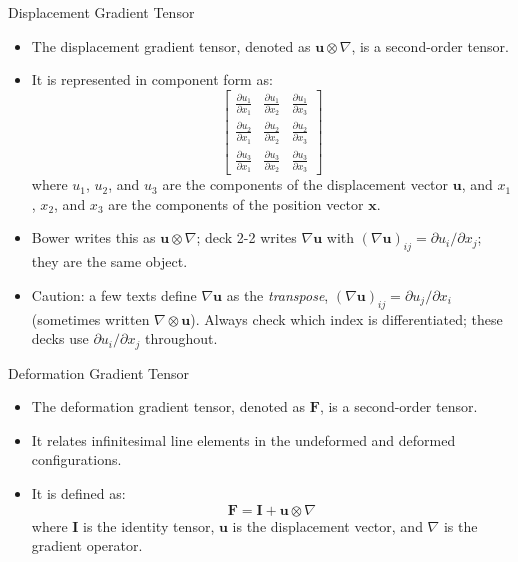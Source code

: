 \documentclass[aspectratio=169,11pt]{beamer}
\begin{document}
\begin{frame}{Displacement Gradient Tensor}
    \begin{itemize}
        \item The displacement gradient tensor, denoted as \(\mathbf{u} \otimes \nabla\), is a second-order tensor.
        \item It is represented in component form as:
            \[
            \begin{bmatrix}
                \frac{\partial u_1}{\partial x_1} & \frac{\partial u_1}{\partial x_2} & \frac{\partial u_1}{\partial x_3} \\
                \frac{\partial u_2}{\partial x_1} & \frac{\partial u_2}{\partial x_2} & \frac{\partial u_2}{\partial x_3} \\
                \frac{\partial u_3}{\partial x_1} & \frac{\partial u_3}{\partial x_2} & \frac{\partial u_3}{\partial x_3}
            \end{bmatrix}
            \]
            where \(u_1\), \(u_2\), and \(u_3\) are the components of the displacement vector \(\mathbf{u}\), and \(x_1\), \(x_2\), and \(x_3\) are the components of the position vector \(\mathbf{x}\).
        \item Bower writes this as \(\mathbf{u} \otimes \nabla\); deck 2-2 writes \(\nabla \mathbf{u}\) with \((\nabla \mathbf{u})_{ij} = \partial u_i / \partial x_j\); they are the same object.
        \item Caution: a few texts define \(\nabla\mathbf{u}\) as the \emph{transpose}, \((\nabla\mathbf{u})_{ij} = \partial u_j/\partial x_i\) (sometimes written \(\nabla\otimes\mathbf{u}\)). Always check which index is differentiated; these decks use \(\partial u_i/\partial x_j\) throughout.
    \end{itemize}
\end{frame}

\begin{frame}{Deformation Gradient Tensor}
    \begin{itemize}
        \item The deformation gradient tensor, denoted as \(\mathbf{F}\), is a second-order tensor.
        \item It relates infinitesimal line elements in the undeformed and deformed configurations.
        \item It is defined as:
            \[
            \mathbf{F} = \mathbf{I} + \mathbf{u} \otimes \nabla
            \]
            where \(\mathbf{I}\) is the identity tensor, \(\mathbf{u}\) is the displacement vector, and \(\nabla\) is the gradient operator.
            \end{itemize}
            \end{frame}
\end{document}
